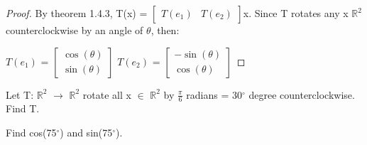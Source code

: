     \begin{proof}
        By {\color{red} theorem 1.4.3},
        T(x) =
        $\begin{bmatrix}
            T(e_1) & T(e_2)
        \end{bmatrix}$x.
        Since T rotates any x $\mathbb{R}^2$ counterclockwise
        by an angle of $\theta$, then:

        \hspace{0.5cm}
        $T(e_1)$ =
        $\begin{bmatrix}
            \cos(\theta) \\
            \sin(\theta)
        \end{bmatrix}$
        \hspace{1cm}
        $T(e_2)$ =
        $\begin{bmatrix}
            -\sin(\theta) \\
            \cos(\theta)
        \end{bmatrix}$
    \end{proof}

    \vspace{0.5cm}



    \begin{example}
        Let T: $\mathbb{R}^2$ $\rightarrow$ $\mathbb{R}^2$
        rotate all x $\in$ $\mathbb{R}^2$ by $\frac{\pi}{6}$ radians
        = 30$^{\circ}$ degree
        counterclockwise. Find T.

        Find cos(75$^{\circ}$) and sin(75$^{\circ}$).
    \end{example}

